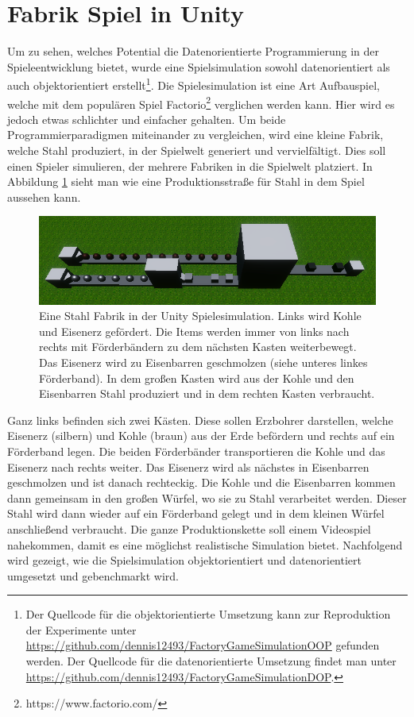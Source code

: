 \section{Fabrik Spiel in Unity}\label{sec:factory}
Um zu sehen, welches Potential die Datenorientierte Programmierung in der Spieleentwicklung bietet, wurde eine Spielsimulation sowohl datenorientiert als auch objektorientiert erstellt\footnote{Der Quellcode für die objektorientierte Umsetzung kann zur Reproduktion der Experimente unter \url{https://github.com/dennis12493/FactoryGameSimulationOOP} gefunden werden. Der Quellcode für die datenorientierte Umsetzung findet man unter \url{https://github.com/dennis12493/FactoryGameSimulationDOP}.}. Die Spielesimulation ist eine Art Aufbauspiel, welche mit dem populären Spiel Factorio\footnote{https://www.factorio.com/} verglichen werden kann. Hier wird es jedoch etwas schlichter und einfacher gehalten. Um beide Programmierparadigmen miteinander zu vergleichen, wird eine kleine Fabrik, welche Stahl produziert, in der Spielwelt generiert und vervielfältigt. Dies soll einen Spieler simulieren, der mehrere Fabriken in die Spielwelt platziert. In Abbildung \ref{fig:steel} sieht man wie eine Produktionsstraße für Stahl in dem Spiel aussehen kann.
\begin{figure}[H]
\includegraphics[scale=0.87]{Bilder/Stahl Fabrik.png}
\caption[Eine Stahl Fabrik in der Unity Spielesimulation]{Eine Stahl Fabrik in der Unity Spielesimulation. Links wird Kohle und Eisenerz gefördert. Die Items werden immer von links nach rechts mit Förderbändern zu dem nächsten Kasten weiterbewegt. Das Eisenerz wird zu Eisenbarren geschmolzen (siehe unteres linkes Förderband). In dem großen Kasten wird aus der Kohle und den Eisenbarren Stahl produziert und in dem rechten Kasten verbraucht.}
\label{fig:steel}
\end{figure}
Ganz links befinden sich zwei Kästen. Diese sollen Erzbohrer darstellen, welche Eisenerz (silbern) und Kohle (braun) aus der Erde befördern und rechts auf ein Förderband legen. Die beiden Förderbänder transportieren die Kohle und das Eisenerz nach rechts weiter. Das Eisenerz wird als nächstes in Eisenbarren geschmolzen und ist danach rechteckig. Die Kohle und die Eisenbarren kommen dann gemeinsam in den großen Würfel, wo sie zu Stahl verarbeitet werden. Dieser Stahl wird dann wieder auf ein Förderband gelegt und in dem kleinen Würfel anschließend verbraucht. Die ganze Produktionskette soll einem Videospiel nahekommen, damit es eine möglichst realistische Simulation bietet. Nachfolgend wird gezeigt, wie die Spielsimulation objektorientiert und datenorientiert umgesetzt und gebenchmarkt wird.

